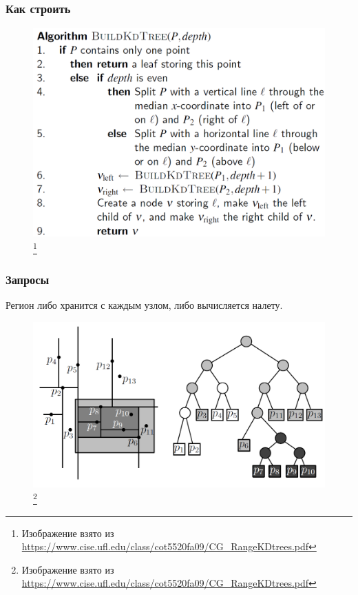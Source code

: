 \documentclass{beamer}
\begin{document}
\begin{frame}
\frametitle{Как строить}

\begin{figure}[htb]
\includegraphics[width=\textwidth,height=0.8\textheight,keepaspectratio]{ex2.png} 
\footnote{\tiny{Изображение взято из \url{https://www.cise.ufl.edu/class/cot5520fa09/CG_RangeKDtrees.pdf}}}
\end{figure}   

\end{frame}

\begin{frame}
\frametitle{Запросы}

Регион либо хранится с каждым узлом, либо вычисляется налету.

\begin{figure}[htb]
\includegraphics[width=\textwidth,height=0.7\textheight,keepaspectratio]{ex3.png} 
\footnote{\tiny{Изображение взято из \url{https://www.cise.ufl.edu/class/cot5520fa09/CG_RangeKDtrees.pdf}}}
\end{figure}   

\end{frame}
\end{document}
